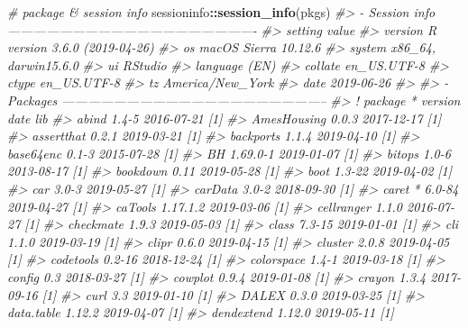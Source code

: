 \documentclass[]{krantz}
\makeatletter
\newenvironment{Shaded}{\begin{snugshade}}{\end{snugshade}}
\newcommand{\CommentTok}[1]{\textcolor[rgb]{0.37,0.37,0.37}{\textit{#1}}}
\newcommand{\KeywordTok}[1]{\textcolor[rgb]{0.27,0.27,0.27}{\textbf{#1}}}
\newcommand{\NormalTok}[1]{#1}
\newcommand{\OperatorTok}[1]{\textcolor[rgb]{0.43,0.43,0.43}{\textbf{#1}}}
\newenvironment{kframe}{%
\medskip{}
\setlength{\fboxsep}{.8em}
 \def\at@end@of@kframe{}%
 \ifinner\ifhmode%
  \def\at@end@of@kframe{\end{minipage}}%
  \begin{minipage}{\columnwidth}%
 \fi\fi%
 \def\FrameCommand##1{\hskip\@totalleftmargin \hskip-\fboxsep
 \colorbox{shadecolor}{##1}\hskip-\fboxsep
     \hskip-\linewidth \hskip-\@totalleftmargin \hskip\columnwidth}%
 \MakeFramed {\advance\hsize-\width
   \@totalleftmargin\z@ \linewidth\hsize
   \@setminipage}}%
 {\par\unskip\endMakeFramed%
 \at@end@of@kframe}
\renewenvironment{Shaded}{\begin{kframe}}{\end{kframe}}
\makeatother
\begin{document}
\begin{Shaded}
\begin{Highlighting}[]
\CommentTok{# package & session info}
\NormalTok{sessioninfo}\OperatorTok{::}\KeywordTok{session_info}\NormalTok{(pkgs)}
\CommentTok{#> - Session info ----------------------------------------------------------}
\CommentTok{#>  setting  value                       }
\CommentTok{#>  version  R version 3.6.0 (2019-04-26)}
\CommentTok{#>  os       macOS Sierra 10.12.6        }
\CommentTok{#>  system   x86_64, darwin15.6.0        }
\CommentTok{#>  ui       RStudio                     }
\CommentTok{#>  language (EN)                        }
\CommentTok{#>  collate  en_US.UTF-8                 }
\CommentTok{#>  ctype    en_US.UTF-8                 }
\CommentTok{#>  tz       America/New_York            }
\CommentTok{#>  date     2019-06-26                  }
\CommentTok{#> }
\CommentTok{#> - Packages --------------------------------------------------------------}
\CommentTok{#>  ! package       * version    date       lib}
\CommentTok{#>    abind           1.4-5      2016-07-21 [1]}
\CommentTok{#>    AmesHousing     0.0.3      2017-12-17 [1]}
\CommentTok{#>    assertthat      0.2.1      2019-03-21 [1]}
\CommentTok{#>    backports       1.1.4      2019-04-10 [1]}
\CommentTok{#>    base64enc       0.1-3      2015-07-28 [1]}
\CommentTok{#>    BH              1.69.0-1   2019-01-07 [1]}
\CommentTok{#>    bitops          1.0-6      2013-08-17 [1]}
\CommentTok{#>    bookdown        0.11       2019-05-28 [1]}
\CommentTok{#>    boot            1.3-22     2019-04-02 [1]}
\CommentTok{#>    car             3.0-3      2019-05-27 [1]}
\CommentTok{#>    carData         3.0-2      2018-09-30 [1]}
\CommentTok{#>    caret         * 6.0-84     2019-04-27 [1]}
\CommentTok{#>    caTools         1.17.1.2   2019-03-06 [1]}
\CommentTok{#>    cellranger      1.1.0      2016-07-27 [1]}
\CommentTok{#>    checkmate       1.9.3      2019-05-03 [1]}
\CommentTok{#>    class           7.3-15     2019-01-01 [1]}
\CommentTok{#>    cli             1.1.0      2019-03-19 [1]}
\CommentTok{#>    clipr           0.6.0      2019-04-15 [1]}
\CommentTok{#>    cluster         2.0.8      2019-04-05 [1]}
\CommentTok{#>    codetools       0.2-16     2018-12-24 [1]}
\CommentTok{#>    colorspace      1.4-1      2019-03-18 [1]}
\CommentTok{#>    config          0.3        2018-03-27 [1]}
\CommentTok{#>    cowplot         0.9.4      2019-01-08 [1]}
\CommentTok{#>    crayon          1.3.4      2017-09-16 [1]}
\CommentTok{#>    curl            3.3        2019-01-10 [1]}
\CommentTok{#>    DALEX           0.3.0      2019-03-25 [1]}
\CommentTok{#>    data.table      1.12.2     2019-04-07 [1]}
\CommentTok{#>    dendextend      1.12.0     2019-05-11 [1]}

\end{Highlighting}
\end{Shaded}
\end{document}
